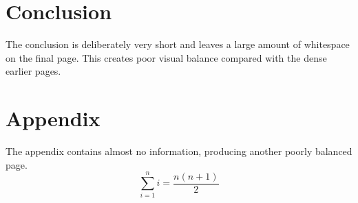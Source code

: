 \documentclass[10pt,a4paper]{article}
\begin{document}
\section{Conclusion}
The conclusion is deliberately very short and leaves a large amount of whitespace on the final page. This creates poor visual balance compared with the dense earlier pages.
\clearpage
\section*{Appendix}
The appendix contains almost no information, producing another poorly balanced page.
\[\sum_{i=1}^{n} i = \frac{n(n+1)}{2}\]
\end{document}
